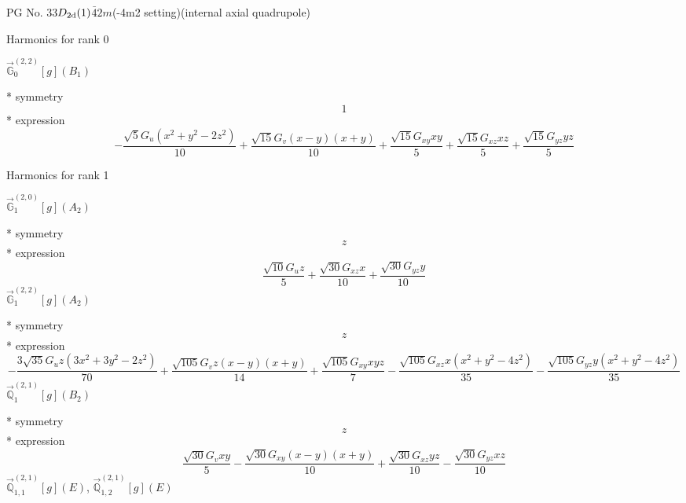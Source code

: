 \documentclass[fleqn,8pt]{jsarticle}
\begin{document}
\setcounter{MaxMatrixCols}{32}

\renewcommand{\tablename}{Table~}
\renewcommand{\figurename}{Figure~}
\begin{center}
\LARGE
PG No. 33\quad$D_{\rm 2d}(1)$\quad$\bar{4}2m$\quad(-4m2 setting)\quad[ tetragonal ] (internal axial quadrupole)
\end{center}

\noindent * Harmonics for rank 0

\noindent\quad $\vec{\mathbb{G}}_{0}^{(2,2)}[g](B_{1})$

\noindent\quad ** symmetry
\begin{dmath*}
1
\end{dmath*}
\noindent\quad ** expression
\begin{dmath*}
- \frac{\sqrt{5} G_{u} \left(x^{2} + y^{2} - 2 z^{2}\right)}{10} + \frac{\sqrt{15} G_{v} \left(x - y\right) \left(x + y\right)}{10} + \frac{\sqrt{15} G_{xy} x y}{5} + \frac{\sqrt{15} G_{xz} x z}{5} + \frac{\sqrt{15} G_{yz} y z}{5}
\end{dmath*}

\noindent * Harmonics for rank 1

\noindent\quad $\vec{\mathbb{G}}_{1}^{(2,0)}[g](A_{2})$

\noindent\quad ** symmetry
\begin{dmath*}
z
\end{dmath*}
\noindent\quad ** expression
\begin{dmath*}
\frac{\sqrt{10} G_{u} z}{5} + \frac{\sqrt{30} G_{xz} x}{10} + \frac{\sqrt{30} G_{yz} y}{10}
\end{dmath*}
\noindent\quad $\vec{\mathbb{G}}_{1}^{(2,2)}[g](A_{2})$

\noindent\quad ** symmetry
\begin{dmath*}
z
\end{dmath*}
\noindent\quad ** expression
\begin{dmath*}
- \frac{3 \sqrt{35} G_{u} z \left(3 x^{2} + 3 y^{2} - 2 z^{2}\right)}{70} + \frac{\sqrt{105} G_{v} z \left(x - y\right) \left(x + y\right)}{14} + \frac{\sqrt{105} G_{xy} x y z}{7} - \frac{\sqrt{105} G_{xz} x \left(x^{2} + y^{2} - 4 z^{2}\right)}{35} - \frac{\sqrt{105} G_{yz} y \left(x^{2} + y^{2} - 4 z^{2}\right)}{35}
\end{dmath*}
\noindent\quad $\vec{\mathbb{Q}}_{1}^{(2,1)}[g](B_{2})$

\noindent\quad ** symmetry
\begin{dmath*}
z
\end{dmath*}
\noindent\quad ** expression
\begin{dmath*}
\frac{\sqrt{30} G_{v} x y}{5} - \frac{\sqrt{30} G_{xy} \left(x - y\right) \left(x + y\right)}{10} + \frac{\sqrt{30} G_{xz} y z}{10} - \frac{\sqrt{30} G_{yz} x z}{10}
\end{dmath*}
\noindent\quad $\vec{\mathbb{Q}}_{1,1}^{(2,1)}[g](E)$, $\vec{\mathbb{Q}}_{1,2}^{(2,1)}[g](E)$
\end{document}
